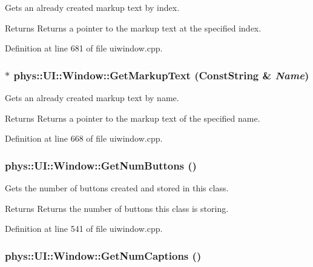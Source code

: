 Gets an already created markup text by index. 

\begin{DoxyReturn}{Returns}
Returns a pointer to the markup text at the specified index. 
\end{DoxyReturn}


Definition at line 681 of file uiwindow.cpp.

\hypertarget{classphys_1_1UI_1_1Window_af5bf2246915fc68558d2a68ed016a68b}{
\subsubsection[{GetMarkupText}]{ $\ast$ phys::UI::Window::GetMarkupText ({\bf ConstString} \& {\em Name})}}
\label{d4/d86/classphys_1_1UI_1_1Window_af5bf2246915fc68558d2a68ed016a68b}


Gets an already created markup text by name. 

\begin{DoxyReturn}{Returns}
Returns a pointer to the markup text of the specified name. 
\end{DoxyReturn}


Definition at line 668 of file uiwindow.cpp.

\hypertarget{classphys_1_1UI_1_1Window_a7eab9b4e1607a2b796072f60b6e3e0cd}{
\subsubsection[{GetNumButtons}]{ phys::UI::Window::GetNumButtons ()}}
\label{d4/d86/classphys_1_1UI_1_1Window_a7eab9b4e1607a2b796072f60b6e3e0cd}


Gets the number of buttons created and stored in this class. 

\begin{DoxyReturn}{Returns}
Returns the number of buttons this class is storing. 
\end{DoxyReturn}


Definition at line 541 of file uiwindow.cpp.

\hypertarget{classphys_1_1UI_1_1Window_a125d78e98b47a4d93f6414545fd2374c}{
\subsubsection[{GetNumCaptions}]{ phys::UI::Window::GetNumCaptions ()}}
\label{d4/d86/classphys_1_1UI_1_1Window_a125d78e98b47a4d93f6414545fd2374c}


